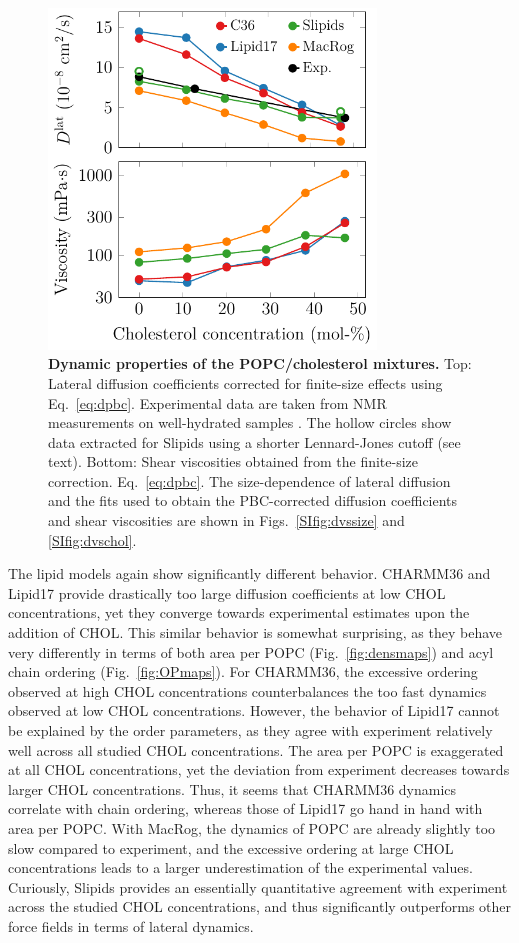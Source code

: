 \documentclass[journal=jctcce]{achemso}
\begin{document}
\begin{figure}[htb!]
  \centering
  \includegraphics[width=8.7cm]{../FIGS/dynamics.pdf}
  \caption{\label{fig:dynamics}%
  \textbf{Dynamic properties of the POPC/cholesterol mixtures.}
  Top: Lateral diffusion coefficients corrected for finite-size effects using Eq.~\eqref{eq:dpbc}. Experimental data are taken from NMR measurements on well-hydrated samples \cite{filippov2003influence,filippov2003effect}. The hollow circles show data extracted for Slipids using a shorter Lennard-Jones cutoff (see text).
  Bottom: Shear viscosities obtained from the finite-size correction. Eq.~\eqref{eq:dpbc}.
  The size-dependence of lateral diffusion and the fits used to obtain the PBC-corrected diffusion coefficients and shear viscosities are shown in Figs.~\ref{SIfig:dvssize} and \ref{SIfig:dvschol}.
  }
\end{figure}

The lipid models again show significantly different behavior. CHARMM36 and Lipid17 provide drastically too large diffusion coefficients at low CHOL concentrations, yet they converge towards experimental estimates upon the addition of CHOL. This similar behavior is somewhat surprising, as they behave very differently in terms of both area per POPC (Fig.~\ref{fig:densmaps}) and acyl chain ordering (Fig.~\ref{fig:OPmaps}). For CHARMM36, the excessive ordering observed at high CHOL concentrations counterbalances the too fast dynamics observed at low CHOL concentrations. However, the behavior of Lipid17 cannot be explained by the order parameters, as they agree with experiment relatively well across all studied CHOL concentrations. The area per POPC is exaggerated at all CHOL concentrations, yet the deviation from experiment decreases towards larger CHOL concentrations. Thus, it seems that CHARMM36 dynamics correlate with chain ordering, whereas those of Lipid17 go hand in hand with area per POPC. With MacRog, the dynamics of POPC are already slightly too slow compared to experiment, and the excessive ordering at large CHOL concentrations leads to a larger underestimation of the experimental values. Curiously, Slipids provides an essentially quantitative agreement with experiment across the studied CHOL concentrations, and thus significantly outperforms other force fields in terms of lateral dynamics. 
\end{document}
